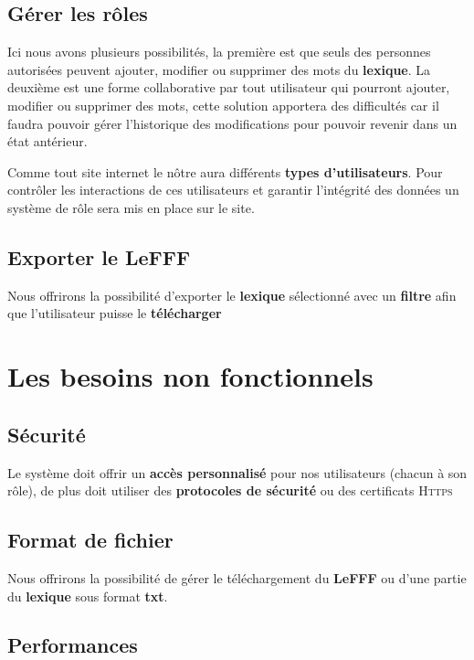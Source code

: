 \subsection{Gérer les rôles}

{Ici nous avons plusieurs possibilités, la première est que seuls des personnes autorisées peuvent ajouter, modifier ou supprimer des mots du \textbf{lexique}. La deuxième est une forme collaborative par tout utilisateur qui pourront ajouter, modifier ou supprimer des mots, cette solution apportera des difficultés car il faudra pouvoir gérer l'historique des modifications pour pouvoir revenir dans un état antérieur.\par}

Comme tout site internet le nôtre aura différents \textbf{types d'utilisateurs}. Pour contrôler les interactions de ces utilisateurs et garantir l'intégrité des données un système de rôle sera mis en place sur le site.
 
 \subsection{Exporter le LeFFF}

{Nous offrirons la possibilité d'exporter le \textbf{lexique} sélectionné avec un \textbf{filtre} afin que l'utilisateur puisse le \textbf{télécharger}\par}

\section{Les besoins non fonctionnels}

\subsection{Sécurité}
{Le système doit offrir un \textbf{accès personnalisé} pour nos utilisateurs (chacun à son rôle), de plus doit utiliser des \textbf{protocoles de sécurité} ou des certificats \textsc{Https} }

\subsection{Format de fichier}
Nous offrirons la possibilité de gérer le téléchargement du \textbf{LeFFF} ou d'une partie du \textbf{lexique} sous format \textbf{txt}.

\subsection{Performances}

